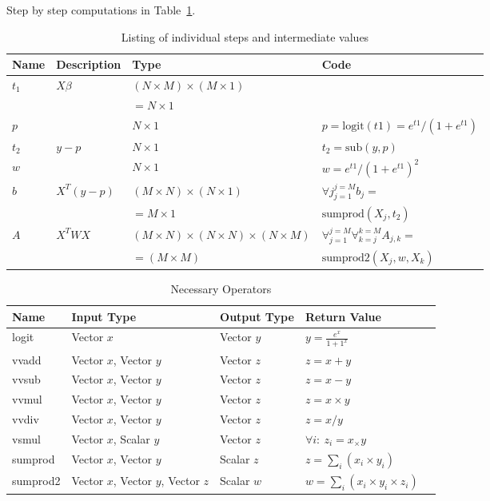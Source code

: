 \documentclass[12pt,timesnewroman,letterpaper]{article}
\begin{document}
Step by step computations in Table~\ref{step_by_step_calc}.
\begin{table}[ht]
\centering
\begin{tabular}{|l|l|l|l|} \hline \hline
  {\bf Name} & {\bf Description} & {\bf Type} & {\bf Code} \\ \hline \hline
  \(t_1\) & \(X \beta\) & \((N \times M) \times (M \times 1)\)  &  \\
  & & \(= N \times 1\) & \\ \hline
  \(p\) & & \(N \times 1\) & \( p = \mathrm{logit}(t1) = e^{t1}/(1 + e^{t1})\) \\ \hline
  \(t_2\) &  \(y - p\) & \(N \times 1\) & \( t_2 = \mathrm{sub}(y, p)\) \\ \hline
  \(w\) & & \(N \times 1\) & \( w = e^{t1}/(1 + e^{t1})^2\) \\ \hline
  \(b\) & \(X^T (y-p)\) & \((M\times N) \times (N \times 1)\)
  & \(\forall j_{j=1}^{j=M} b_j = \) \\ 
        & & \( = M \times 1 \) & \(\mathrm{sumprod}(X_j, t_2)\) \\ \hline
  \(A\) & \(X^T W X\) & \((M \times N) \times (N \times N) \times (N \times M)\)
  & \(\forall_{j=1}^{j=M} \forall_{k=j}^{k=M} A_{j, k} = \) \\ 
  & & \(= (M \times M)\) & \(\mathrm{sumprod2}(X_j, w, X_k)\) \\ \hline
  \hline

\hline
\end{tabular}
\caption{Listing of individual steps and intermediate values}
\label{step_by_step_calc}
\end{table}

\begin{table}[hb]
\centering
\begin{tabular}{|l|l|l|l|l|} \hline \hline
  {\bf Name} & {\bf Input Type} & {\bf Output Type} & {\bf Return Value} \\ \hline \hline
  logit & Vector \(x\) & Vector \(y\) & \(y = \frac{e^x}{1 + 1^x}\) \\ \hline
  vvadd & Vector \(x\), Vector \(y\) & Vector \(z\) & \(z = x + y \)  \\ \hline
  vvsub & Vector \(x\), Vector \(y\) & Vector \(z\) & \(z = x - y \)  \\ \hline
  vvmul & Vector \(x\), Vector \(y\) & Vector \(z\) & \(z = x \times y \)  \\ \hline
  vvdiv & Vector \(x\), Vector \(y\) & Vector \(z\) & \(z = x / y \)  \\ \hline
  vsmul & Vector \(x\), Scalar \(y\) & Vector \(z\) & \(\forall i:~z_i = x_ \times y \)  \\ \hline
  sumprod & Vector \(x\), Vector \(y\) & Scalar \(z\) & \(z = \sum_i (x_i \times y_i)\) \\ \hline
  sumprod2 & Vector \(x\), Vector \(y\), Vector \(z\) & Scalar \(w\) &  \(w = \sum_i (x_i \times y_i \times z_i)\) \\ \hline
\hline
\end{tabular}
\caption{Necessary Operators}
\label{tbl_custom_ops}
\end{table}
\end{document}
